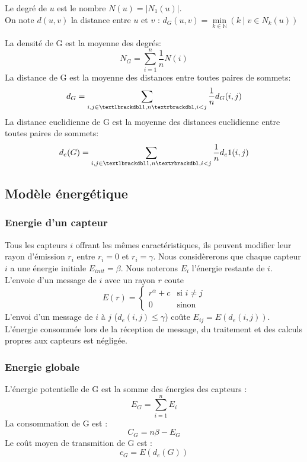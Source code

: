 \begin{mydef}
 Le degré de $ u $ est le nombre  $N(u)=|N_1(u)|$.\\
 On note $d(u,v)$ la distance entre $ u $ et $ v $ : $d_G(u,v)= \min\limits_{k \in \mathbb{N}}(k \mid v \in N_k(u))$
\end{mydef}

\begin{mydef}
 La densité de G est la moyenne des degrés:$$N_G=\sum_{i=1}^n{\frac1n N(i)}$$
 La distance de G est la moyenne des distances entre toutes paires de sommets:$$d_G=\sum_{i,j\in \textlbrackdbl 1,n \textrbrackdbl,i<j}{\frac1n d_G(i,j)}$$
 La distance euclidienne de G est la moyenne des distances euclidienne entre toutes paires de sommets:$$d_e(G)=\sum_{i,j\in \textlbrackdbl 1,n \textrbrackdbl,i<j}{\frac1n d_e1(i,j)}$$

\end{mydef}

\subsection{Modèle énergétique}
\subsubsection{Energie d'un capteur}
Tous les capteurs $i$ offrant les mêmes caractéristiques, ils peuvent modifier leur rayon d'émission $r_i$ entre $r_i=0$ et $r_i=\gamma$.
Nous considèrerons que chaque capteur $i$ a une énergie initiale $E_{init}=\beta$.
Nous noterons $E_i$ l'énergie restante de $i$.
L'envoie d'un message de $i$ avec un rayon $r$ coute $$ E(r)= \begin{cases} r^\alpha + c & \text{si }i\neq j \\ 0 & \text{sinon}  \end{cases}$$
L'envoi d'un message de $i$ à $j$ ($d_e(i,j)\leq \gamma$) coûte  $ E_{ij}=E(d_e(i,j))$.
L'énergie consommée lors de la réception de message, du traitement et des calculs propres aux capteurs est négligée.


\subsubsection{Energie globale}
\begin{mydef}
 L'énergie potentielle de G est la somme des énergies des capteurs :$$E_G=\sum_{i=1}^n{E_i}$$
 La consommation de  G est :$$C_G=n\beta - E_G$$
 Le coût moyen de transmition de  G est :$$c_G=E(d_e(G))$$

\end{mydef}

